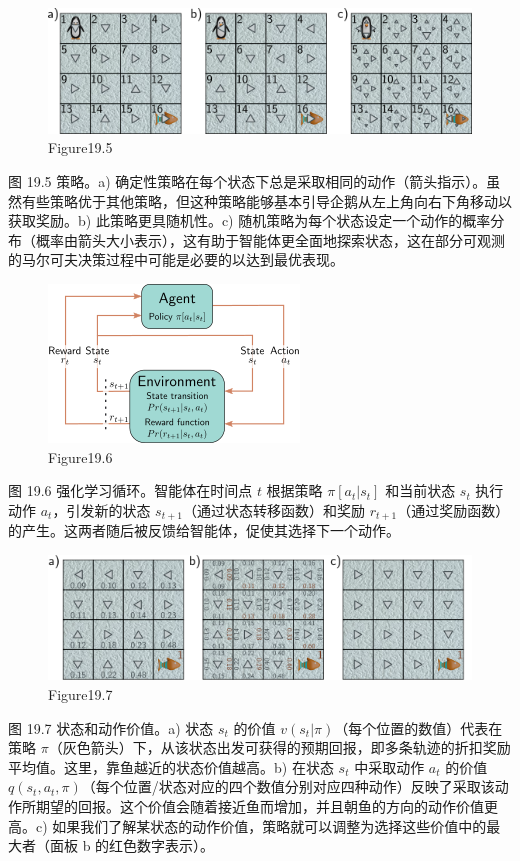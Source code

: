 \begin{figure}[h!]
\centering
\includegraphics[width=0.7\linewidth]{png/chapter19/ReinforcePolicy.png}
\caption{Figure19.5}
\end{figure}
图 19.5 策略。a) 确定性策略在每个状态下总是采取相同的动作（箭头指示）。虽然有些策略优于其他策略，但这种策略能够基本引导企鹅从左上角向右下角移动以获取奖励。b) 此策略更具随机性。c) 随机策略为每个状态设定一个动作的概率分布（概率由箭头大小表示），这有助于智能体更全面地探索状态，这在部分可观测的马尔可夫决策过程中可能是必要的以达到最优表现。

\begin{figure}[h!]
\centering
\includegraphics[width=0.7\linewidth]{png/chapter19/ReinforceMDPLoop.png}
\caption{Figure19.6}
\end{figure}
图 19.6 强化学习循环。智能体在时间点 \(t\) 根据策略 \(\pi[a_t|s_t]\) 和当前状态 \(s_t\) 执行动作 \(a_t\)，引发新的状态 \(s_{t+1}\)（通过状态转移函数）和奖励 \(r_{t+1}\)（通过奖励函数）的产生。这两者随后被反馈给智能体，促使其选择下一个动作。

\begin{figure}[h!]
\centering
\includegraphics[width=0.7\linewidth]{png/chapter19/ReinforceValueOfAction.png}
\caption{Figure19.7}
\end{figure}
图 19.7 状态和动作价值。a) 状态 \(s_t\) 的价值 \(v(s_t|\pi)\)（每个位置的数值）代表在策略 \(\pi\)（灰色箭头）下，从该状态出发可获得的预期回报，即多条轨迹的折扣奖励平均值。这里，靠鱼越近的状态价值越高。b) 在状态 \(s_t\) 中采取动作 \(a_t\) 的价值 \(q(s_t, a_t, \pi)\)（每个位置/状态对应的四个数值分别对应四种动作）反映了采取该动作所期望的回报。这个价值会随着接近鱼而增加，并且朝鱼的方向的动作价值更高。c) 如果我们了解某状态的动作价值，策略就可以调整为选择这些价值中的最大者（面板 b 的红色数字表示）。

